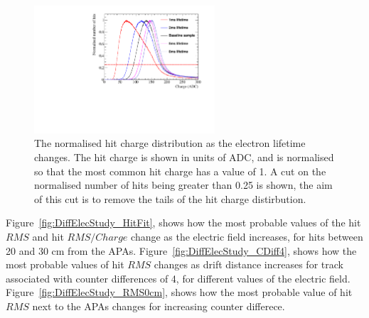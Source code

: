 \begin{figure}[h!]
  \centering
  \includegraphics[width=0.6\textwidth]{Canvas_ChargeCut_ElecLifetime}
  \caption[The normalised hit charge distribution as the electron lifetime changes]
          {The normalised hit charge distribution as the electron lifetime changes. The hit charge is shown in units of ADC, and is normalised so that the most common hit charge has a value of 1. A cut on the normalised number of hits being greater than 0.25 is shown, the aim of this cut is to remove the tails of the hit charge distirbution.}
  \label{fig:DiffLifeStudy_ChargeCut}
\end{figure}

Figure~\ref{fig:DiffElecStudy_HitFit}, shows how the most probable values of the hit $RMS$ and hit $RMS/Charge$ change as the electric field increases, for hits between 20 and 30 cm from the APAs. Figure~\ref{fig:DiffElecStudy_CDiff4}, shows how the most probable values of hit $RMS$ changes as drift distance increases for track associated with counter differences of 4, for different values of the electric field. Figure~\ref{fig:DiffElecStudy_RMS0cm}, shows how the most probable value of hit $RMS$ next to the APAs changes for increasing counter differece. \\

